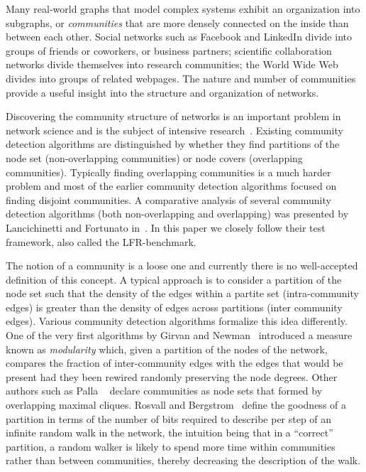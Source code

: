 Many real-world graphs that model complex systems exhibit an organization 
into subgraphs, or \textit{communities} that are more densely connected on the inside than between each other. 
Social networks such as Facebook and LinkedIn divide into groups of friends 
or coworkers, or business partners; scientific collaboration networks divide 
themselves into research communities; the World Wide Web divides into groups 
of related webpages. The nature and number of communities provide 
a useful insight into the structure and organization of networks. 

Discovering the community structure of networks is an 
important problem in network science and is the subject 
of intensive research~\cite{GN02, GN04, CNM04, RCC04, DM04, PDFV05, NL07, 
BGLL08, RB08, RN09}. Existing community detection algorithms are 
distinguished by whether they find partitions of the node set 
(non-overlapping communities) or node covers (overlapping communities). 
Typically finding overlapping communities is a much harder problem and most of the 
earlier community detection algorithms focused on finding disjoint 
communities. A comparative analysis of several community detection algorithms 
(both non-overlapping and overlapping) was presented by Lancichinetti and Fortunato 
in~\cite{LF09}. In this paper we closely follow their test framework, 
also called the LFR-benchmark.

The notion of a community is a loose one and currently there is no 
well-accepted definition of this concept. A typical approach is to consider 
a partition of the node set such that the density of the edges within a partite 
set (intra-community edges) is greater than the density of edges across partitions 
(inter community edges). Various community detection algorithms formalize this
idea differently. One of the very first algorithms by
Girvan and Newman~\cite{GN02} introduced a measure known as \textit{modularity}
which, given a partition of the nodes of the network, compares the fraction of 
inter-community edges with the edges that would be present had they been 
rewired randomly preserving the node degrees. Other authors such as Palla 
\etal~\cite{PDFV05} declare communities as node sets that formed 
by overlapping maximal cliques. Rosvall and Bergstrom~\cite{RB08} 
define the goodness of a partition in terms of the number of bits required to 
describe per step of an infinite random walk in the network, the intuition being 
that in a ``correct'' partition, a random walker is likely to spend more time 
within communities rather than between communities, thereby decreasing the 
description of the walk.  

